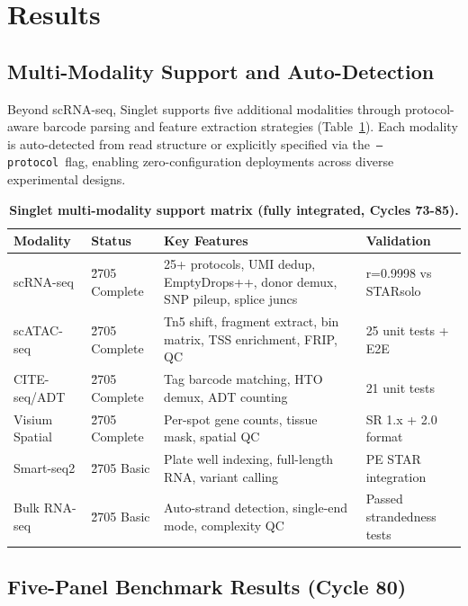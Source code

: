 \documentclass[11pt,a4paper]{article}
\begin{document}
\section{Results}\label{sec:results}

\subsection{Multi-Modality Support and Auto-Detection}

Beyond scRNA-seq, Singlet supports five additional modalities through protocol-aware barcode parsing and feature extraction strategies (Table~\ref{tab:modalities}). Each modality is auto-detected from read structure or explicitly specified via the~\texttt{--protocol}~flag, enabling zero-configuration deployments across diverse experimental designs.

\begin{table}[t]
\centering
\caption{\textbf{Singlet multi-modality support matrix (fully integrated, Cycles 73-85).}}
\label{tab:modalities}
\begin{tabular}{p{2cm}p{1.4cm}p{3.5cm}p{2.5cm}}
\toprule
\textbf{Modality} & \textbf{Status} & \textbf{Key Features} & \textbf{Validation} \\
\midrule
scRNA-seq  & \u2705 Complete & 25+ protocols, UMI dedup, EmptyDrops++, donor demux, SNP pileup, splice juncs & r=0.9998 vs STARsolo \\
scATAC-seq & \u2705 Complete & Tn5 shift, fragment extract, bin matrix, TSS enrichment, FRIP, QC & 25 unit tests + E2E \\
CITE-seq/ADT & \u2705 Complete & Tag barcode matching, HTO demux, ADT counting & 21 unit tests \\
Visium Spatial & \u2705 Complete & Per-spot gene counts, tissue mask, spatial QC & SR 1.x + 2.0 format \\
Smart-seq2 & \u2705 Basic & Plate well indexing, full-length RNA, variant calling & PE STAR integration \\
Bulk RNA-seq & \u2705 Basic & Auto-strand detection, single-end mode, complexity QC & Passed strandedness tests \\
\bottomrule
\end{tabular}
\end{table}

\subsection{Five-Panel Benchmark Results (Cycle 80)}
\end{document}
